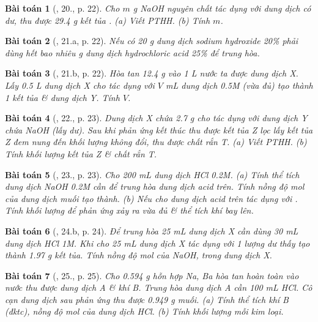 \documentclass{article}
\newtheorem{baitoan}{Bài toán}
\begin{document}
\begin{baitoan}[\cite{An_350_BT_Hoa_Hoc_9}, 20., p. 22]
	Cho $m$ \emph{g NaOH} nguyên chất tác dụng với dung dịch \emph{} có dư, thu được \emph{29.4 g} kết tủa \emph{}. (a) Viết PTHH. (b) Tính $m$.
\end{baitoan}

\begin{baitoan}[\cite{An_350_BT_Hoa_Hoc_9}, 21.a, p. 22]
	Nếu có \emph{20 g} dung dịch sodium hydroxide \emph{20\%} phải dùng hết bao nhiêu \emph{g} dung dịch hydrochloric acid \emph{25\%} để trung hòa.
\end{baitoan}

\begin{baitoan}[\cite{An_350_BT_Hoa_Hoc_9}, 21.b, p. 22]
	Hòa tan \emph{12.4 g } vào \emph{1 L} nước ta được dung dịch X. Lấy \emph{0.5 L} dung dịch X cho tác dụng với $V$ \emph{mL} dung dịch \emph{ 0.5M} (vừa đủ) tạo thành 1 kết tủa \& dung dịch Y. Tính $V$.
\end{baitoan}

\begin{baitoan}[\cite{An_350_BT_Hoa_Hoc_9}, 22., p. 23]
	Dung dịch X chứa \emph{2.7 g } cho tác dụng với dung dịch Y chứa \emph{NaOH} (lấy dư). Sau khi phản ứng kết thúc thu được kết tủa Z lọc lấy kết tủa Z đem nung đến khối lượng không đổi, thu được chất rắn T. (a) Viết PTHH. (b) Tính khối lượng kết tủa Z \& chất rắn T.
\end{baitoan}

\begin{baitoan}[\cite{An_350_BT_Hoa_Hoc_9}, 23., p. 23]
	Cho \emph{200 mL} dung dịch \emph{HCl 0.2M}. (a) Tính thể tích dung dịch \emph{NaOH 0.2M} cần để trung hòa dung dịch acid trên. Tính nồng độ mol của dung dịch muối tạo thành. (b) Nếu cho dung dịch acid trên tác dụng với \emph{}. Tính khối lượng \emph{} để phản ứng xảy ra vừa đủ \& thể tích khí bay lên.
\end{baitoan}

\begin{baitoan}[\cite{An_350_BT_Hoa_Hoc_9}, 24.b, p. 24]
	Để trung hòa \emph{25 mL} dung dịch X cần dùng \emph{30 mL} dung dịch \emph{HCl 1M}. Khi cho \emph{25 mL} dung dịch X tác dụng với 1 lượng dư \emph{} thấy tạo thành \emph{1.97 g} kết tủa. Tính nồng độ mol của \emph{NaOH, } trong dung dịch X.
\end{baitoan}

\begin{baitoan}[\cite{An_350_BT_Hoa_Hoc_9}, 25., p. 25]
	Cho \emph{0.594 g} hỗn hợp \emph{Na, Ba} hòa tan hoàn toàn vào nước thu được dung dịch A \& khí B. Trung hòa dung dịch A cần \emph{100 mL HCl}. Cô cạn dung dịch sau phản ứng thu được \emph{0.949 g} muối. (a) Tính thể tích khí B (đktc), nồng độ mol của dung dịch \emph{HCl}. (b) Tính khối lượng mỗi kim loại.
\end{baitoan}
\end{document}
